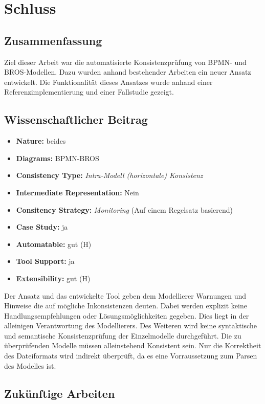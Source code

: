 \chapter{Schluss}

\section{Zusammenfassung}

Ziel dieser Arbeit war die automatisierte Konsistenzprüfung von BPMN- und BROS-Modellen.
Dazu wurden anhand bestehender Arbeiten ein neuer Ansatz entwickelt.
Die Funktionalität dieses Ansatzes wurde anhand einer Referenzimplementierung und einer Fallstudie gezeigt.  

\section{Wissenschaftlicher Beitrag}

\begin{itemize}
    \item \textbf{Nature:} beides
    \item \textbf{Diagrams:} BPMN-BROS
    \item \textbf{Consistency Type:} \emph{Intra-Modell (horizontale) Konsistenz}
    \item \textbf{Intermediate Representation:} Nein
    \item \textbf{Consitency Strategy:} \emph{Monitoring} (Auf einem Regelsatz basierend)
    \item \textbf{Case Study:} ja
    \item \textbf{Automatable:} gut (H)
    \item \textbf{Tool Support:} ja
    \item \textbf{Extensibility:} gut (H)
\end{itemize}

Der Ansatz und das entwickelte Tool geben dem Modellierer Warnungen und Hinweise die auf mögliche Inkonsistenzen deuten.
Dabei werden explizit keine Handlungsempfehlungen oder Lösungsmöglichkeiten gegeben.
Dies liegt in der alleinigen Verantwortung des Modellierers.
Des Weiteren wird keine syntaktische und semantische Konsistenzprüfung der Einzelmodelle durchgeführt.
Die zu überprüfenden Modelle müssen alleinstehend Konsistent sein.
Nur die Korrektheit des Dateiformats wird indirekt überprüft, da es eine Vorraussetzung zum Parsen des Modelles ist.

\section{Zukünftige Arbeiten}

